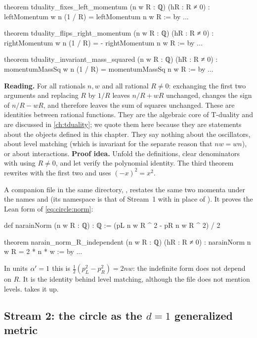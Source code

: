 \begin{leanbox}
\begin{leancode}
theorem tduality_fixes_left_momentum (n w R : ℚ) (hR : R ≠ 0) :
    leftMomentum w n (1 / R) = leftMomentum n w R := by ...

theorem tduality_flips_right_momentum (n w R : ℚ) (hR : R ≠ 0) :
    rightMomentum w n (1 / R) = - rightMomentum n w R := by ...

theorem tduality_invariant_mass_squared (n w R : ℚ) (hR : R ≠ 0) :
    momentumMassSq w n (1 / R) = momentumMassSq n w R := by ...
\end{leancode}
\textbf{Reading.} For all rationals $n,w$ and all rational $R\neq0$: exchanging the first two
arguments and replacing $R$ by $1/R$ leaves $n/R+wR$ unchanged, changes the sign of
$n/R-wR$, and therefore leaves the sum of squares unchanged. These are identities between
rational functions. They are the algebraic core of T-duality and are discussed in
\cref{ch:tduality}; we quote them here because they are statements about the objects defined
in this chapter. They say nothing about the oscillators, about level matching (which is
invariant for the separate reason that $nw=wn$), or about interactions.
\textbf{Proof idea.} Unfold the definitions, clear denominators with  using
$R\neq0$, and let  verify the polynomial identity. The third theorem rewrites with
the first two and uses $(-x)^2=x^2$.
\end{leanbox}

A companion file in the same directory, , restates the same two
momenta under the names  and  (its namespace is that of Stream~1 with
 in place of ). It proves the Lean form of
\eqref{eq:circle:norm}:
\begin{leancode}
def narainNorm (n w R : ℚ) : ℚ := (pL n w R ^ 2 - pR n w R ^ 2) / 2

theorem narain_norm_R_independent (n w R : ℚ) (hR : R ≠ 0) :
    narainNorm n w R = 2 * n * w := by ...
\end{leancode}
In units $\alpha'=1$ this is $\frac12(p_L^2-p_R^2)=2nw$: the indefinite form does not depend on
$R$. It is the identity behind level matching, although the file does not mention levels.
 takes it up.

\subsection{Stream 2: the circle as the \texorpdfstring{$d=1$}{d=1} generalized metric}


